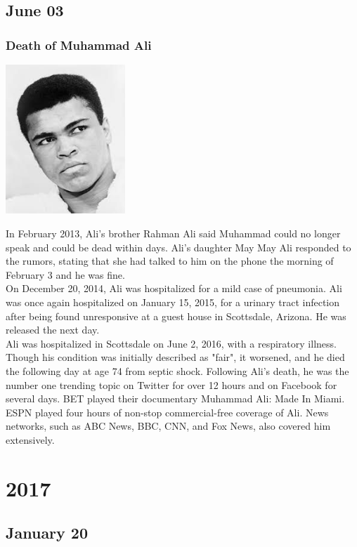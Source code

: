 \documentclass[11pt]{report}
\begin{document}
\section{June 03}
\subsection{Death of Muhammad Ali}
\vspace{2mm}\begin{center}\includegraphics[width=4.5cm]{./img/muhammadAli.jpg}\end{center}
In February 2013, Ali's brother Rahman Ali said Muhammad could no longer speak and could be dead within days. Ali's daughter May May Ali responded to the rumors, stating that she had talked to him on the phone the morning of February 3 and he was fine.\\
\indent On December 20, 2014, Ali was hospitalized for a mild case of pneumonia. Ali was once again hospitalized on January 15, 2015, for a urinary tract infection after being found unresponsive at a guest house in Scottsdale, Arizona. He was released the next day.\\
\indent Ali was hospitalized in Scottsdale on June 2, 2016, with a respiratory illness. Though his condition was initially described as "fair", it worsened, and he died the following day at age 74 from septic shock. Following Ali's death, he was the number one trending topic on Twitter for over 12 hours and on Facebook for several days. BET played their documentary Muhammad Ali: Made In Miami. ESPN played four hours of non-stop commercial-free coverage of Ali. News networks, such as ABC News, BBC, CNN, and Fox News, also covered him extensively.

\chapter{2017}
\section{January 20}
\end{document}

